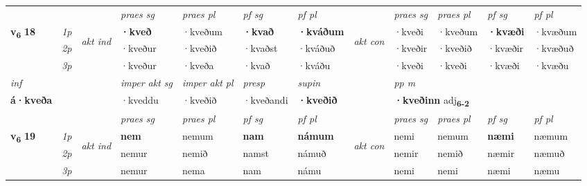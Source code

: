 \begin{longtable}[l]{X>{\footnotesize\itshape}llXXXXlXXXX}
\midrule

 & &   & \textit{praes sg}  & \textit{praes pl}    & \textit{ pf sg} & \textit{pf pl} & & \textit{praes sg}  & \textit{praes pl}    & \textit{pf sg} & \textit{pf pl }  \\ \cmidrule{4-7} \cmidrule{9-12}
 \multirow{2}{*}{{{\textbf{v{\textsubscript{6}}} \Large{\textbf{18}}}}}  & 1p & \multirow{3}{*}{\begin{turn}{90}\textit{akt ind}\end{turn}} & \textbf{·kveð} & ·kveðum & \textbf{·kvað} & \textbf{·kváðum} & \multirow{3}{*}{\begin{turn}{90}\textit{akt con}\end{turn}} &·kveði & ·kveðum & \textbf{·kvæði} & ·kvæðum\\*
 & 2p &  &  ·kveður  & ·kveðið & ·kvaðst & ·kváðuð & & ·kveðir & ·kveðið & ·kvæðir & ·kvæðuð \\*
 & 3p &  & ·kveður & ·kveða & ·kvað & ·kváðu & & ·kveði & ·kveði& ·kvæði & ·kvæðu \\*
\cmidrule{4-7} \cmidrule{9-12}

   {\textit{inf}} & &  & \textit{imper akt sg} & \textit{imper akt pl}   & \textit{presp} & \textit{supin}  && \textit{pp m} \\*
  {\textbf{á\allowbreak ·kveða}} & && ·kveddu  & ·kveðið   & ·kveðandi &  \textbf{·kveðið}  && \multicolumn{2}{l}{\textbf{·kveðinn} adj\textbf{\textsubscript{6-2}}} \\*

\midrule

 & &   & \textit{praes sg}  & \textit{praes pl}    & \textit{ pf sg} & \textit{pf pl} & & \textit{praes sg}  & \textit{praes pl}    & \textit{pf sg} & \textit{pf pl }  \\ \cmidrule{4-7} \cmidrule{9-12}
 \multirow{2}{*}{{{\textbf{v{\textsubscript{6}}} \Large{\textbf{19}}}}}  & 1p & \multirow{3}{*}{\begin{turn}{90}\textit{akt ind}\end{turn}} & \textbf{nem} & nemum & \textbf{nam} & \textbf{námum} & \multirow{3}{*}{\begin{turn}{90}\textit{akt con}\end{turn}} &nemi & nemum & \textbf{næmi} & næmum\\*
 & 2p &  &  nemur  & nemið & namst & námuð & & nemir & nemið & næmir & næmuð \\*
 & 3p &  & nemur & nema & nam & námu & & nemi & nemi& næmi & næmu \\*
\cmidrule{4-7} \cmidrule{9-12}


\end{longtable}
